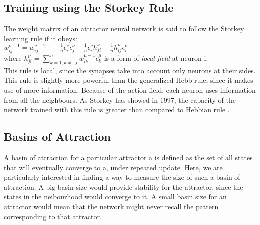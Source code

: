 \subsection{Training using the Storkey Rule}

The weight matrix of an attractor neural network is said to follow the Storkey learning rule if it obeys:\\

\( w_{ij}^{\nu-1} = w_{ij}^{\nu-1}+
		    +\frac{1}{n}\epsilon_{i}^{\nu} \epsilon_{j}^{\nu} 
		    -\frac{1}{n}\epsilon_{i}^{\nu} h_{ji}^{\nu}
		    -\frac{1}{n}h_{ij}^{\nu} \epsilon_{i}^{\nu}
		    \)\\ 

where \( h_{ji}^{\nu} = \sum_{k=1,k\neq,j}^{n} w_{ik}^{\mu-1}\epsilon_{k}^{\mu} \) is a form of \emph{local field} \cite{storkey1997increasing} at neuron i.\\ 
		    
This rule is local, since the synapses take into account only neurons at their sides. This rule is slightly more powerful than the generalized Hebb rule, since it makes use of more information. Because of the action field, each neuron uses information from all the neighbours. As Storkey has showed in 1997, the capacity of the network trained with this rule is greater than compared to Hebbian rule \cite{storkey1997increasing}.


\subsection{Basins of Attraction}

A basin of attraction for a particular attractor a is defined as the set of all states that will eventually converge to a, under repeated update. Here, we are particularly interested in finding a way to measure the size of such a basin of attraction. A big basin size would provide stability for the attractor, since the states in the neibourhood would converge to it. A small basin size for an attractor would mean that the network might never recall the pattern corresponding to that attractor. 

